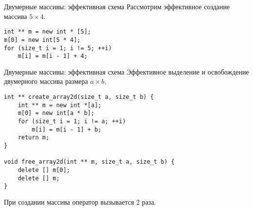 \documentclass{beamer}
\begin{document}
\begin{frame}[fragile]{Двумерные массивы: эффективная схема}
    Рассмотрим эффективное создание массива $5\times 4$.
    
\begin{center}
        \begin{lstlisting}
int ** m = new int * [5];
m[0] = new int[5 * 4];
for (size_t i = 1; i != 5; ++i)
    m[i] = m[i - 1] + 4;
        \end{lstlisting}
\end{center}
\end{frame}

\begin{frame}[fragile]{Двумерные массивы: эффективная схема}
    Эффективное выделение и освобождение двумерного массива размера $a\times b$.

    \begin{lstlisting}
int ** create_array2d(size_t a, size_t b) {
    int ** m = new int *[a];
    m[0] = new int[a * b];
    for (size_t i = 1; i != a; ++i)
        m[i] = m[i - 1] + b;
    return m;
}

void free_array2d(int ** m, size_t a, size_t b) {
    delete [] m[0];
    delete [] m;
}
        \end{lstlisting}
При создании массива оператор  вызывается 2 раза.
\end{frame}
\end{document}
